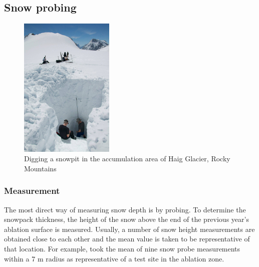 \documentclass[12pt]{article}
\begin{document}
\subsection{Snow probing}
\label{snowprobing}
\begin{figure}
 \centering
      \includegraphics[width=0.4\textwidth]{snowpit.jpg}
  \caption{Digging a snowpit in the accumulation area of Haig Glacier, Rocky Mountains}
        \label{snowpit}
\end{figure}

\subsubsection{Measurement}
The most direct way of measuring snow depth is by probing. To determine the snowpack thickness, the height of the snow above the end of the previous year's ablation surface is measured. Usually, a number of snow height measurements are obtained close to each other and the mean value is taken to be representative of that location. For example, \cite{Machguth2006} took the mean of nine snow probe measurements within a 7 m radius as representative of a test site in the ablation zone.  
\end{document}
